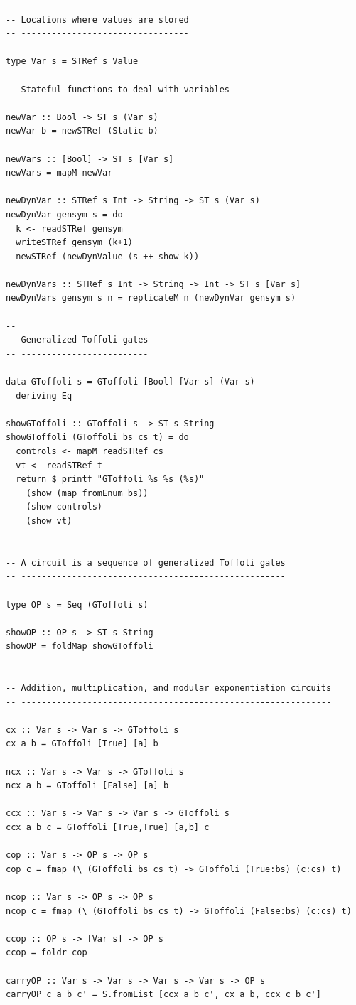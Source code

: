 \documentclass{article}
\begin{document}
\begin{verbatim}
--
-- Locations where values are stored
-- ---------------------------------

type Var s = STRef s Value

-- Stateful functions to deal with variables

newVar :: Bool -> ST s (Var s)
newVar b = newSTRef (Static b)

newVars :: [Bool] -> ST s [Var s]
newVars = mapM newVar

newDynVar :: STRef s Int -> String -> ST s (Var s)
newDynVar gensym s = do
  k <- readSTRef gensym
  writeSTRef gensym (k+1)
  newSTRef (newDynValue (s ++ show k))

newDynVars :: STRef s Int -> String -> Int -> ST s [Var s]
newDynVars gensym s n = replicateM n (newDynVar gensym s)

--
-- Generalized Toffoli gates
-- -------------------------

data GToffoli s = GToffoli [Bool] [Var s] (Var s)
  deriving Eq

showGToffoli :: GToffoli s -> ST s String
showGToffoli (GToffoli bs cs t) = do
  controls <- mapM readSTRef cs
  vt <- readSTRef t
  return $ printf "GToffoli %s %s (%s)"
    (show (map fromEnum bs))
    (show controls)
    (show vt)

--
-- A circuit is a sequence of generalized Toffoli gates
-- ----------------------------------------------------

type OP s = Seq (GToffoli s)

showOP :: OP s -> ST s String
showOP = foldMap showGToffoli

--
-- Addition, multiplication, and modular exponentiation circuits
-- -------------------------------------------------------------

cx :: Var s -> Var s -> GToffoli s
cx a b = GToffoli [True] [a] b

ncx :: Var s -> Var s -> GToffoli s
ncx a b = GToffoli [False] [a] b

ccx :: Var s -> Var s -> Var s -> GToffoli s
ccx a b c = GToffoli [True,True] [a,b] c

cop :: Var s -> OP s -> OP s
cop c = fmap (\ (GToffoli bs cs t) -> GToffoli (True:bs) (c:cs) t)

ncop :: Var s -> OP s -> OP s
ncop c = fmap (\ (GToffoli bs cs t) -> GToffoli (False:bs) (c:cs) t)

ccop :: OP s -> [Var s] -> OP s
ccop = foldr cop 

carryOP :: Var s -> Var s -> Var s -> Var s -> OP s
carryOP c a b c' = S.fromList [ccx a b c', cx a b, ccx c b c']


\end{verbatim}
\end{document}

